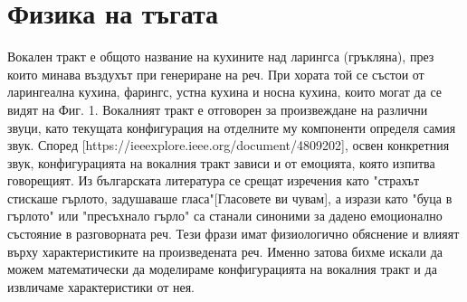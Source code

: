 \documentclass[12pt]{report}
\numberwithin{equation}{section}
\numberwithin{figure}{section}
\begin{document}
    \section{Физика на тъгата}
    Вокален тракт е общото название на кухините над ларингса (гръкляна), през които минава въздухът при генериране на реч.
    При хората той се състои от ларингеална кухина, фарингс, устна кухина и носна кухина, които могат да се видят на Фиг. 1.
    Вокалният тракт е отговорен за произвеждане на различни звуци, като текущата конфигурация на отделните му компоненти определя самия звук.
    Според [https://ieeexplore.ieee.org/document/4809202], освен конкретния звук, конфигурацията на вокалния тракт зависи и от емоцията, която изпитва говорещият. 
    Из българската литература се срещат изречения като "страхът стискаше гърлото, задушаваше гласа"[Гласовете ви чувам], а изрази като "буца в гърлото" или "пресъхнало гърло" са станали синоними за дадено емоционално
    състояние в разговорната реч. Тези фрази имат физиологично обяснение и влияят върху характеристиките на произведената реч.
    Именно затова бихме искали да можем математически да моделираме конфигурацията на вокалния тракт и да извличаме характеристики от нея.
\end{document}

